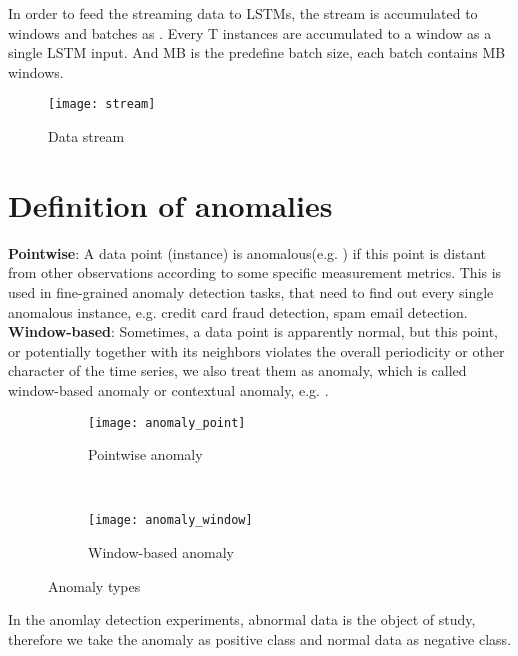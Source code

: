 In order to feed the streaming data to LSTMs, the stream is accumulated to windows and batches as . Every T instances are accumulated to a window as a single LSTM input. And MB is the predefine batch size, each batch contains MB windows.\\

\begin{figure}[h]
\centering
\texttt{[image: stream]}
\caption[Data stream]{Data stream}
\label{fig:stream}
\end{figure}




\section{Definition of anomalies}
\label{sec:Definition of anomalies}

\textbf{Pointwise}: A data point (instance) is anomalous(e.g. ) if this point is distant from other observations according to some specific measurement metrics. This is used in fine-grained anomaly detection tasks, that need to find out every single anomalous instance, e.g. credit card fraud detection, spam email detection.\\

\textbf{Window-based}: Sometimes, a data point is apparently normal, but this point, or potentially together with its neighbors violates the overall periodicity or other character of the time series, we also treat them as anomaly, which is called window-based anomaly or contextual anomaly, e.g. .\\
\begin{figure}[h]
\centering
	\begin {subfigure}[t]{8cm}
	\centering
	\texttt{[image: anomaly\_point]}
	\caption{Pointwise anomaly}
	\label{fig:point}
	\end{subfigure}
	~
	\begin {subfigure}[t]{8cm}
	\centering
	\texttt{[image: anomaly\_window]}
	\caption{Window-based anomaly}
	\label{fig:window}
	\end{subfigure}
	\caption[Anomaly types]{Anomaly types}
\label{fig:anomalytypes}

\end{figure}




In the anomlay detection experiments, abnormal data is the object of study, therefore we take the anomaly as positive class and normal data as negative class. \\

